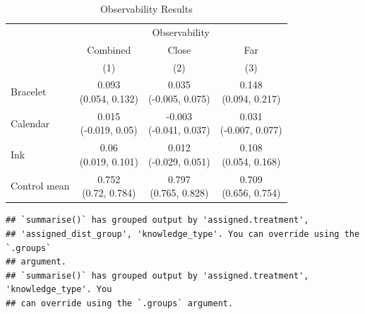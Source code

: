 \documentclass[
]{article}
\begin{document}
\begin{table}
\centering
\caption{\label{tab:fob-table}Observability Results}
\centering
\begin{tabular}[t]{lccc}
\toprule
\multicolumn{1}{c}{ } & \multicolumn{3}{c}{Observability} \\
\cmidrule(l{3pt}r{3pt}){2-4}
\multicolumn{1}{c}{ } & \multicolumn{1}{c}{Combined} & \multicolumn{1}{c}{Close} & \multicolumn{1}{c}{Far} \\
 & (1) & (2) & (3)\\
\midrule
Bracelet & \makecell[c]{0.093\\(0.054, 0.132)} & \makecell[c]{0.035\\(-0.005, 0.075)} & \makecell[c]{0.148\\(0.094, 0.217)}\\
\addlinespace \addlinespace \addlinespace
Calendar & \makecell[c]{0.015\\(-0.019, 0.05)} & \makecell[c]{-0.003\\(-0.041, 0.037)} & \makecell[c]{0.031\\(-0.007, 0.077)}\\
\addlinespace \addlinespace \addlinespace
Ink & \makecell[c]{0.06\\(0.019, 0.101)} & \makecell[c]{0.012\\(-0.029, 0.051)} & \makecell[c]{0.108\\(0.054, 0.168)}\\
\midrule
\addlinespace \addlinespace \addlinespace
Control mean & \makecell[c]{0.752\\(0.72, 0.784)} & \makecell[c]{0.797\\(0.765, 0.828)} & \makecell[c]{0.709\\(0.656, 0.754)}\\
\bottomrule
\end{tabular}
\end{table}

\begin{verbatim}
## `summarise()` has grouped output by 'assigned.treatment',
## 'assigned_dist_group', 'knowledge_type'. You can override using the `.groups`
## argument.
## `summarise()` has grouped output by 'assigned.treatment', 'knowledge_type'. You
## can override using the `.groups` argument.
\end{verbatim}
\end{document}
